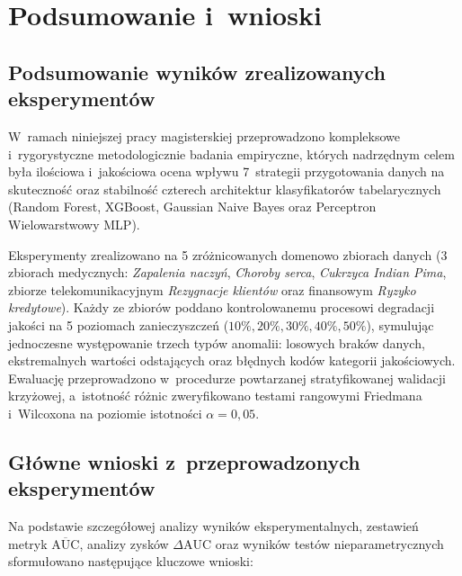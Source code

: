 \chapter{Podsumowanie i~wnioski}

\section{Podsumowanie wyników zrealizowanych eksperymentów}
W~ramach niniejszej pracy magisterskiej przeprowadzono kompleksowe i~rygorystyczne metodologicznie badania empiryczne, których nadrzędnym celem była ilościowa i~jakościowa ocena wpływu 7~strategii przygotowania danych na skuteczność oraz stabilność czterech architektur klasyfikatorów tabelarycznych (Random Forest, XGBoost, Gaussian Naive Bayes oraz Perceptron Wielowarstwowy MLP).

Eksperymenty zrealizowano na 5 zróżnicowanych domenowo zbiorach danych (3 zbiorach medycznych: \textit{Zapalenia naczyń}, \textit{Choroby serca}, \textit{Cukrzyca Indian Pima}, zbiorze telekomunikacyjnym \textit{Rezygnacje klientów} oraz finansowym \textit{Ryzyko kredytowe}). Każdy ze zbiorów poddano kontrolowanemu procesowi degradacji jakości na 5 poziomach zanieczyszczeń ($10\%, 20\%, 30\%, 40\%, 50\%$), symulując jednoczesne występowanie trzech typów anomalii: losowych braków danych, ekstremalnych wartości odstających oraz błędnych kodów kategorii jakościowych. Ewaluację przeprowadzono w~procedurze powtarzanej stratyfikowanej walidacji krzyżowej, a~istotność różnic zweryfikowano testami rangowymi Friedmana i~Wilcoxona na poziomie istotności $\alpha = 0{,}05$.

\section{Główne wnioski z~przeprowadzonych eksperymentów}
Na podstawie szczegółowej analizy wyników eksperymentalnych, zestawień metryk $\overline{\mathrm{AUC}}$, analizy zysków $\Delta \mathrm{AUC}$ oraz wyników testów nieparametrycznych sformułowano następujące kluczowe wnioski:

